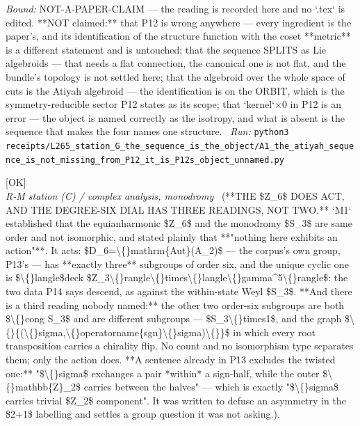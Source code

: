 \begin{description}
 \emph{Bound:} NOT-A-PAPER-CLAIM --- the reading is recorded here and no `.tex` is edited. **NOT claimed:** that P12 is wrong anywhere --- every ingredient is the paper's, and its identification of the structure function with the coset **metric** is a different statement and is untouched; that the sequence SPLITS as Lie algebroids --- that needs a flat connection, the canonical one is not flat, and the bundle's topology is not settled here; that the algebroid over the whole space of cuts is the Atiyah algebroid --- the identification is on the ORBIT, which is the symmetry-reducible sector P12 states as its scope; that `kernel`\ensuremath{\times}0 in P12 is an error --- the object is named correctly as the isotropy, and what is absent is the sequence that makes the four names one structure.
\ \emph{Run:} \texttt{python3 receipts/L265\_station\_G\_the\_sequence\_is\_the\_object/A1\_the\_atiyah\_sequence\_is\_not\_missing\_from\_P12\_it\_is\_P12s\_object\_unnamed.py}
\item[\label{rcpt:C1_the_degree_six_dial_has_three_readings_and_the_paper_excludes_one}\texttt{C1\_the\_degree\_six\_dial\_has\_three\_readings\_and\_the\_paper\_excludes\_one}]\hfill\textsf{[OK]}\\
\textit{R-M station (C) / complex analysis, monodromy} \ (**THE \$Z\_6\$ DOES ACT, AND THE DEGREE-SIX DIAL HAS THREE READINGS, NOT TWO.** `M1` established that the equianharmonic \$Z\_6\$ and the monodromy \$S\_3\$ are same order and not isomorphic, and stated plainly that **"nothing here exhibits an action"**. It acts: \$D\_6=\textbackslash\{\}mathrm\{Aut\}(A\_2)\$ --- the corpus's own group, P13's --- has **exactly three** subgroups of order six, and the unique cyclic one is \$\textbackslash\{\}langle\$deck \$Z\_3\textbackslash\{\}rangle\textbackslash\{\}times\textbackslash\{\}langle\textbackslash\{\}gamma\textasciicircum{}5\textbackslash\{\}rangle\$: the two data P14 says descend, as against the within-state Weyl \$S\_3\$. **And there is a third reading nobody named:** the other two order-six subgroups are both \$\textbackslash\{\}cong S\_3\$ and are different subgroups --- \$S\_3\textbackslash\{\}times1\$, and the graph \$\textbackslash\{\}\{(\textbackslash\{\}sigma,\textbackslash\{\}operatorname\{sgn\}\textbackslash\{\}sigma)\textbackslash\{\}\}\$ in which every root transposition carries a chirality flip. No count and no isomorphism type separates them; only the action does. **A sentence already in P13 excludes the twisted one:** "\$\textbackslash\{\}sigma\$ exchanges a pair *within* a sign-half, while the outer \$\textbackslash\{\}mathbb\{Z\}\_2\$ carries between the halves" --- which is exactly "\$\textbackslash\{\}sigma\$ carries trivial \$Z\_2\$ component". It was written to defuse an asymmetry in the \$2+1\$ labelling and settles a group question it was not asking.). 

\end{description}
